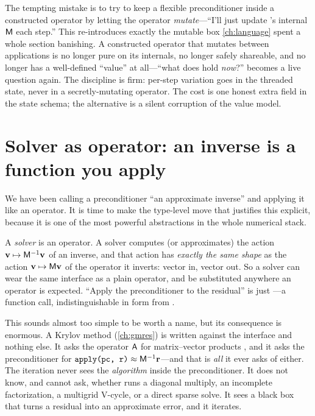 \begin{pitfall}
The tempting mistake is to try to keep a flexible preconditioner inside a constructed
operator by letting the operator \emph{mutate}---``I'll just update 's
internal $\mathsf{M}$ each step.'' This re-introduces exactly the mutable box
\cref{ch:language} spent a whole section banishing. A constructed operator that
mutates between applications is no longer pure on its internals, no longer safely
shareable, and no longer has a well-defined ``value'' at all---``what does 
hold \emph{now}?'' becomes a live question again. The discipline is firm: per-step
variation goes in the threaded state, never in a secretly-mutating operator. The cost
is one honest extra field in the state schema; the alternative is a silent corruption
of the value model.
\end{pitfall}

\section{Solver as operator: an inverse is a function you apply}

We have been calling a preconditioner ``an approximate inverse'' and applying it like
an operator. It is time to make the type-level move that justifies this explicit,
because it is one of the most powerful abstractions in the whole numerical stack.

\begin{keyidea}
A \emph{solver} is an operator. A solver computes (or approximates) the action
$\mathbf{v} \mapsto \mathsf{M}^{-1}\mathbf{v}$ of an inverse, and that action has \emph{exactly the
same shape} as the action $\mathbf{v} \mapsto \mathsf{M}\mathbf{v}$ of the operator it inverts: vector
in, vector out. So a solver can wear the same  interface as a plain
operator, and be substituted anywhere an operator is expected. ``Apply the
preconditioner to the residual'' is just ---a function call,
indistinguishable in form from .
\end{keyidea}

This sounds almost too simple to be worth a name, but its consequence is enormous. A
Krylov method (\cref{ch:gmres}) is written against the  interface and
nothing else. It asks the operator $\mathsf{A}$ for matrix--vector products
, and it asks the preconditioner for $\texttt{apply(pc, r)} \approx
\mathsf{M}^{-1}\mathbf{r}$---and that is \emph{all} it ever asks of either. The iteration never
sees the \emph{algorithm} inside the preconditioner. It does not know, and cannot
ask, whether  runs a diagonal multiply, an incomplete
factorization, a multigrid V-cycle, or a direct sparse solve. It sees a black box
that turns a residual into an approximate error, and it iterates.

